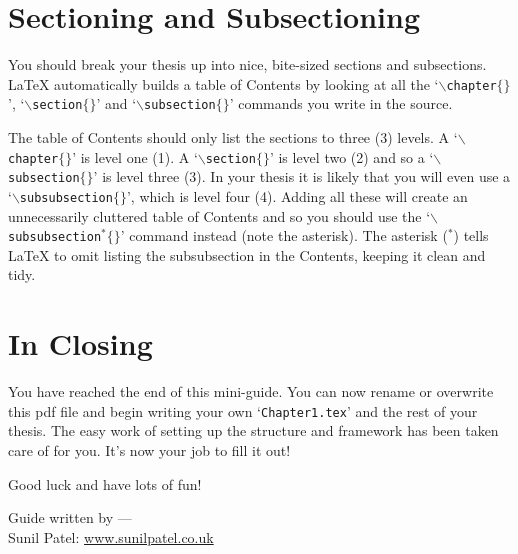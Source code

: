 \section{Sectioning and Subsectioning}

You should break your thesis up into nice, bite-sized sections and subsections. \LaTeX{} automatically builds a table of Contents by looking at all the `$\backslash$\texttt{chapter}$\{\}$', `$\backslash$\texttt{section}$\{\}$' and `$\backslash$\texttt{subsection}$\{\}$' commands you write in the source.

The table of Contents should only list the sections to three (3) levels. A `$\backslash$\texttt{chapter}$\{\}$' is level one (1). A `$\backslash$\texttt{section}$\{\}$' is level two (2) and so a `$\backslash$\texttt{subsection}$\{\}$' is level three (3). In your thesis it is likely that you will even use a `$\backslash$\texttt{subsubsection}$\{\}$', which is level four (4). Adding all these will create an unnecessarily cluttered table of Contents and so you should use the `$\backslash$\texttt{subsubsection$^{*}\{\}$}' command instead (note the asterisk). The asterisk ($^{*}$) tells \LaTeX{} to omit listing the subsubsection in the Contents, keeping it clean and tidy.


\section{In Closing}

You have reached the end of this mini-guide. You can now rename or overwrite this pdf file and begin writing your own `\texttt{Chapter1.tex}' and the rest of your thesis. The easy work of setting up the structure and framework has been taken care of for you. It's now your job to fill it out!

Good luck and have lots of fun!

\begin{flushright}
Guide written by ---\\
Sunil Patel: \href{http://www.sunilpatel.co.uk}{www.sunilpatel.co.uk}
\end{flushright}
